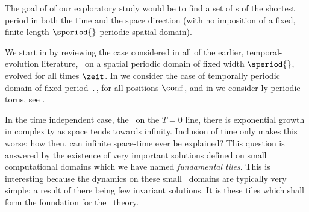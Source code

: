 The goal of of our exploratory study would be to find a
set of {\rpo}s of the shortest period in both the time and the space
direction (with no imposition of a fixed, finite length $\speriod{}$ periodic
spatial domain).

We start in   by reviewing the case considered in
all of the earlier, temporal-evolution literature, \KS\ on a spatial periodic
domain of fixed width $\speriod{}$, evolved for all times $\zeit$.
In  we consider the case of temporally periodic
domain of fixed period $\period{}$,  for all positions $\conf$,
and
in  we consider {\spt}ly periodic torus, see
.

In the time independent case, the \KSe\ on the $T=0$ line,
there is exponential growth in complexity
as space tends towards infinity. Inclusion of time
only makes this worse; how then, can infinite space-time ever
be explained? This question is answered by the existence
of very important solutions defined on small computational domains
which we have named \textit{fundamental tiles}. This is interesting
because the dynamics on these small \spt\ domains are typically
very simple; a result of there being few invariant solutions.
It is these tiles which shall form the foundation for the
\spt\ theory.





